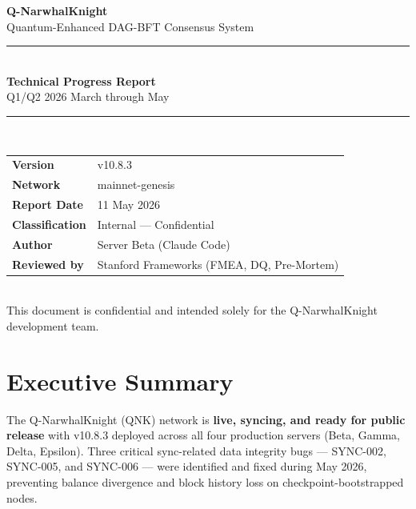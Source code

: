 \documentclass[12pt,a4paper]{article}
\begin{document}
\begin{titlepage}
\centering
\vspace*{1.8cm}
{\Huge\bfseries\color{qblue} Q-NarwhalKnight}\\[0.35em]
{\Large Quantum-Enhanced DAG-BFT Consensus System}\\[1.8em]
\rule{\linewidth}{1.5pt}\\[1em]
{\LARGE\bfseries Technical Progress Report}\\[0.4em]
{\large Q1/Q2 2026 \quad March through May}\\[0.8em]
\rule{\linewidth}{1.5pt}\\[2em]
\vfill
\begin{tabular}{@{}ll@{}}
\textbf{Version}         & v10.8.3 \\[2pt]
\textbf{Network}         & mainnet-genesis \\[2pt]
\textbf{Report Date}     & 11 May 2026 \\[2pt]
\textbf{Classification}  & Internal — Confidential \\[2pt]
\textbf{Author}          & Server Beta (Claude Code) \\[2pt]
\textbf{Reviewed by}     & Stanford Frameworks (FMEA, DQ, Pre-Mortem) \\
\end{tabular}\\[2em]
\textcolor{qgray}{\small This document is confidential and intended solely for the
Q-NarwhalKnight development team.}
\end{titlepage}

\section{Executive Summary}

The Q-NarwhalKnight (QNK) network is \textbf{live, syncing, and ready for public release}
with v10.8.3 deployed across all four production servers (Beta, Gamma, Delta, Epsilon).
Three critical sync-related data integrity bugs — SYNC-002, SYNC-005, and SYNC-006 —
were identified and fixed during May 2026, preventing balance divergence and block
history loss on checkpoint-bootstrapped nodes.
\end{document}
